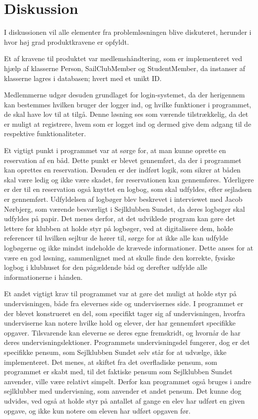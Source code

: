 \chapter{Diskussion}\label{chap:diskussion}

I diskussionen vil alle elementer fra problemløsningen blive diskuteret, herunder i hvor høj grad produktkravene er opfyldt.

Et af kravene til produktet var medlemshåndtering, som er implementeret ved hjælp af klasserne Person, SailClubMember og StudentMember, da instanser af klasserne lagres i databasen; hvert med et unikt ID.

Medlemmerne udgør desuden grundlaget for login-systemet, da der herigennem kan bestemmes hvilken bruger der logger ind, og hvilke funktioner i programmet, de skal have lov til at tilgå.  
Denne løsning ses som værende tilstrækkelig, da det er muligt at registrere, hvem som er logget ind og dermed give dem adgang til de respektive funktionaliteter. 

Et vigtigt punkt i programmet var at sørge for, at man kunne oprette en reservation af en båd. 
Dette punkt er blevet gennemført, da der i programmet kan oprettes en reservation. 
Desuden er der indført logik, som sikrer at båden skal være ledig og ikke være skadet, før reservationen kan gennemføres.
Yderligere er der til en reservation også knyttet en logbog, som skal udfyldes, efter sejladsen er gennemført. 
Udfyldelsen af logbøger blev beskrevet i interviewet med Jacob Nørbjerg, som værende besværligt i Sejlklubben Sundet, da deres logbøger skal udfyldes på papir. 
Det menes derfor, at det udviklede program kan gøre det lettere for klubben at holde styr på logbøger, ved at digitalisere dem, holde referencer til hvilken sejltur de hører til, sørge for at ikke alle kan udfylde logbøgerne og ikke mindst indeholde de krævede informationer. 
Dette anses for at være en god løsning, sammenlignet med at skulle finde den korrekte, fysiske logbog i klubhuset for den pågældende båd og derefter udfylde alle informationerne i hånden. 

Et andet vigtigt krav til programmet var at gøre det muligt at holde styr på undervisningen, både fra elevernes side og undervisernes side. 
I programmet er der blevet konstrueret en del, som specifikt tager sig af undervisningen, hvorfra underviserne kan notere hvilke hold og elever, der har gennemført specifikke opgaver.
Tilsvarende kan eleverne se deres egne fremskridt, og hvornår de har deres undervisningslektioner.
Programmets undervisningsdel fungerer, dog er det specifikke pensum, som Sejlklubben Sundet selv står for at udvælge, ikke implementeret. 
Det menes, at skiftet fra det overfladiske pensum, som programmet er skabt med, til det faktiske pensum som Sejlklubben Sundet anvender, ville være relativt simpelt. 
Derfor kan programmet også bruges i andre sejlklubber med undervisning, som anvender et andet pensum. 
Det kunne dog udvides, ved også at holde styr på antallet af gange en elev har udført en given opgave, og ikke kun notere om eleven har udført opgaven før.


